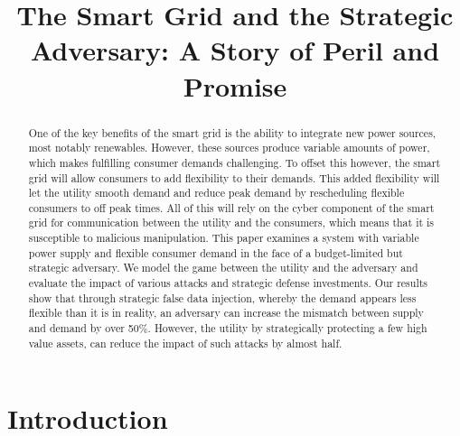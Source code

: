 \documentclass[conference]{IEEEtran}
\begin{document}
\title{The Smart Grid and the Strategic Adversary: A Story of Peril and Promise}
\thispagestyle{plain}
\pagestyle{plain}

\author{
}

\maketitle

\begin{abstract}
One of the key benefits of the smart grid is the ability to integrate new power sources, most notably renewables. However, these sources produce variable amounts of power, which makes fulfilling consumer demands challenging. To offset this however, the smart grid will allow consumers to add flexibility to their demands. This added flexibility will let the utility smooth demand and reduce peak demand by rescheduling flexible consumers to off peak times. All of this will rely on the cyber component of the smart grid for communication between the utility and the consumers, which means that it is susceptible to malicious manipulation. This paper examines a system with variable power supply and flexible consumer demand in the face of a budget-limited but strategic adversary. We model the game between the utility and the adversary and evaluate the impact of various attacks and strategic defense investments. Our results show that through strategic false data injection, whereby the demand appears less flexible than it is in reality, an adversary can increase the mismatch between supply and demand by over 50\%. However, the utility by strategically protecting a few high value assets, can reduce the impact of such attacks by almost half. 

\end{abstract}

\section{Introduction}
\label{Introduction}
\end{document}
